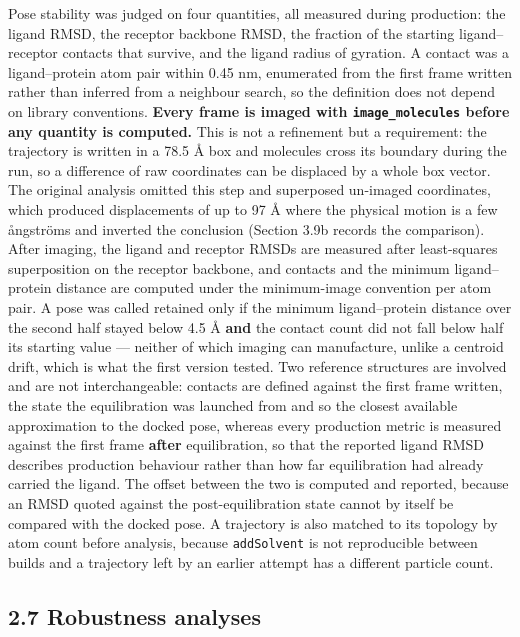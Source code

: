 \documentclass[utf8]{FrontiersinVancouver}
\begin{document}
Pose stability was judged on four quantities, all measured during production: the ligand RMSD, the receptor backbone RMSD, the fraction of the starting ligand--receptor contacts that survive, and the ligand radius of gyration. A contact was a ligand--protein atom pair within 0.45 nm, enumerated from the first frame written rather than inferred from a neighbour search, so the definition does not depend on library conventions. \textbf{Every frame is imaged with \texttt{image\_molecules} before any quantity is computed.} This is not a refinement but a requirement: the trajectory is written in a 78.5 \AA{} box and molecules cross its boundary during the run, so a difference of raw coordinates can be displaced by a whole box vector. The original analysis omitted this step and superposed un-imaged coordinates, which produced displacements of up to 97 \AA{} where the physical motion is a few \aa{}ngströms and inverted the conclusion (Section 3.9b records the comparison). After imaging, the ligand and receptor RMSDs are measured after least-squares superposition on the receptor backbone, and contacts and the minimum ligand--protein distance are computed under the minimum-image convention per atom pair. A pose was called retained only if the minimum ligand--protein distance over the second half stayed below 4.5 \AA{} \textbf{and} the contact count did not fall below half its starting value --- neither of which imaging can manufacture, unlike a centroid drift, which is what the first version tested. Two reference structures are involved and are not interchangeable: contacts are defined against the first frame written, the state the equilibration was launched from and so the closest available approximation to the docked pose, whereas every production metric is measured against the first frame \textbf{after} equilibration, so that the reported ligand RMSD describes production behaviour rather than how far equilibration had already carried the ligand. The offset between the two is computed and reported, because an RMSD quoted against the post-equilibration state cannot by itself be compared with the docked pose. A trajectory is also matched to its topology by atom count before analysis, because \texttt{addSolvent} is not reproducible between builds and a trajectory left by an earlier attempt has a different particle count.

\subsection{2.7 Robustness analyses}
\end{document}
